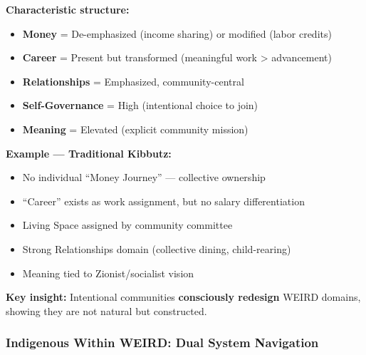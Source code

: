 \begin{tcolorbox}[colback=green!5!white, colframe=green!75!black, title=Pattern: Intentional Communities (N$_{\text{eff}}$ = 5-6)]

\textbf{Characteristic structure:}
\begin{itemize}[nosep]
\item \textbf{Money} = De-emphasized (income sharing) or modified (labor credits)
\item \textbf{Career} = Present but transformed (meaningful work > advancement)
\item \textbf{Relationships} = Emphasized, community-central
\item \textbf{Self-Governance} = High (intentional choice to join)
\item \textbf{Meaning} = Elevated (explicit community mission)
\end{itemize}

\textbf{Example --- Traditional Kibbutz:}
\begin{itemize}[nosep]
\item No individual ``Money Journey'' --- collective ownership
\item ``Career'' exists as work assignment, but no salary differentiation
\item Living Space assigned by community committee
\item Strong Relationships domain (collective dining, child-rearing)
\item Meaning tied to Zionist/socialist vision
\end{itemize}

\textbf{Key insight:} Intentional communities \textbf{consciously redesign} WEIRD domains, showing they are not natural but constructed.

\end{tcolorbox}

\subsubsection{Indigenous Within WEIRD: Dual System Navigation}

